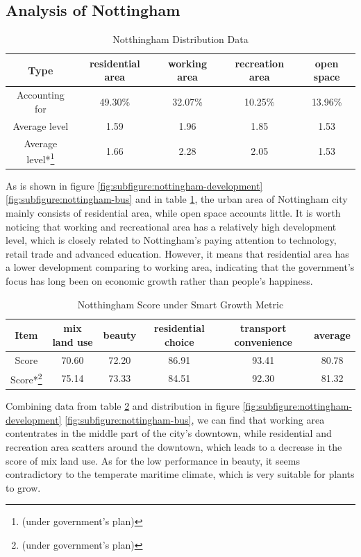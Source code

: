 \subsection{Analysis of Nottingham}
\begin{table}[t]
\centering
  \begin{tabular}{c|cccc}
    \hline
    Type & residential area & working area & recreation area & open space \\
    \hline
    Accounting for & 49.30\% & 32.07\% & 10.25\% & 13.96\% \\
    \hline
    Average level & 1.59 & 1.96 & 1.85 & 1.53 \\
    Average level*\footnote{(under government's plan)} & 1.66 & 2.28 & 2.05 & 1.53 \\
    \hline
  \end{tabular}
  \caption{Notthingham Distribution Data}
  \label{tab:nottingham-data}
\end{table}

As is shown in figure \ref{fig:subfigure:nottingham-development} \ref{fig:subfigure:nottingham-bus} and in table \ref{tab:nottingham-data}, the urban area of Nottingham city mainly consists of residential area, while open space accounts little.
It is worth noticing that working and recreational area has a relatively high development level, which is closely related to Nottingham's paying attention to technology, retail trade and advanced education.
However, it means that residential area has a lower development comparing to working area, indicating that the government's focus has long been on economic growth rather than people's happiness.\\
\begin{table}[t]
\centering
  \begin{tabular}{c|cccc|c}
    \hline
    Item & mix land use & beauty & residential choice & transport convenience & average \\
    \hline
    Score & 70.60 & 72.20 & 86.91 & 93.41 & 80.78 \\
    Score*\footnote{(under government's plan)} & 75.14 & 73.33 & 84.51 & 92.30 & 81.32 \\
    \hline
  \end{tabular}
  \caption{Notthingham Score under Smart Growth Metric}
  \label{tab:nottingham-score}
\end{table}

Combining data from table \ref{tab:nottingham-score} and distribution in figure \ref{fig:subfigure:nottingham-development} \ref{fig:subfigure:nottingham-bus}, we can find that working area contentrates in the middle part of the city's downtown, while residential and recreation area scatters around the downtown, which leads to a decrease in the score of mix land use.
As for the low performance in beauty, it seems contradictory to the temperate maritime climate, which is very suitable for plants to grow.\\

